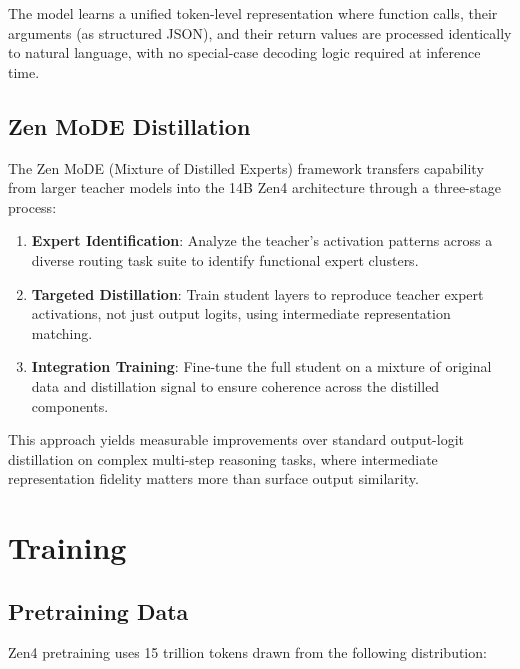 \documentclass[11pt,a4paper]{article}
\begin{document}
The model learns a unified token-level representation where function calls, their arguments
(as structured JSON), and their return values are processed identically to natural language,
with no special-case decoding logic required at inference time.

\subsection{Zen MoDE Distillation}

The Zen MoDE (Mixture of Distilled Experts) framework transfers capability from larger teacher
models into the 14B Zen4 architecture through a three-stage process:

\begin{enumerate}
    \item \textbf{Expert Identification}: Analyze the teacher's activation patterns across
    a diverse routing task suite to identify functional expert clusters.
    \item \textbf{Targeted Distillation}: Train student layers to reproduce teacher expert
    activations, not just output logits, using intermediate representation matching.
    \item \textbf{Integration Training}: Fine-tune the full student on a mixture of original
    data and distillation signal to ensure coherence across the distilled components.
\end{enumerate}

This approach yields measurable improvements over standard output-logit distillation on
complex multi-step reasoning tasks, where intermediate representation fidelity matters more
than surface output similarity.

\section{Training}

\subsection{Pretraining Data}

Zen4 pretraining uses 15 trillion tokens drawn from the following distribution:
\end{document}
